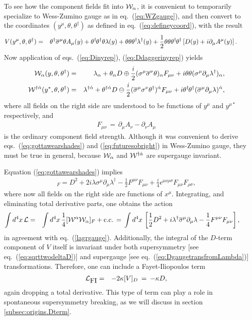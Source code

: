 \documentclass[12pt]{article}
\def\BDplus{+}
\def\BDminus{-}
\def\thetasigmamuthetadagger{\theta\sigma^\mu\theta^\dagger}
\def\BDplus{-}
\def\BDminus{+}
\def\thetasigmamuthetadagger{\theta^\dagger\sigmabar^\mu\theta}
\def\BDplus{\oplus}
\def\BDminus{\ominus}
\def\thetasigmamuthetadagger{\theta\sigma^\mu\theta^\dagger}
\def\BDplus{\ominus}
\def\BDminus{\oplus}
\def\thetasigmamuthetadagger{\theta^\dagger\sigmabar^\mu\theta}
\newcommand{\thdthd}{\theta^\dagger\hspace{-1pt}\theta^\dagger}
\def\beq{\begin{eqnarray}}
\def\eeq{\end{eqnarray}}
\def\sigmabar{\overline\sigma}
\begin{document}
To see how the component fields fit into ${\cal W}_\alpha$, it is convenient
to temporarily specialize to Wess-Zumino gauge as in eq.~(\ref{eq:WZgauge}), and
then convert to the coordinates $(y^\mu, \theta, \theta^\dagger)$ 
as defined in eq.~(\ref{eq:defineycoord}), with the result 
\beq
V(y^\mu, \theta,\theta^\dagger) &=&
\thetasigmamuthetadagger  A_\mu(y) 
+ \thdthd \theta \lambda(y) 
+ \theta \theta  \theta^\dagger\hspace{-1pt} \lambda^\dagger(y)  
+ \frac{1}{2} \theta\theta\thdthd 
\left [D(y)
+ i \partial_\mu A^\mu(y) \right ].\phantom{xxx}
\eeq
Now application of eqs.~(\ref{eq:Dinyrep}), (\ref{eq:Ddaggerinyrep}) 
yields
\beq
{\cal W}_\alpha(y,\theta,\theta^\dagger)
&=& 
\lambda_\alpha + \theta_\alpha D 
\BDminus \frac{i}{2} (\sigma^\mu\sigmabar^\nu\theta)_\alpha F_{\mu\nu}
+ i \theta\theta (\sigma^\mu\partial_\mu \lambda^\dagger)_\alpha ,
\label{eq:gottawearshades}
\\
{\cal W}^{\dagger\dot\alpha}(y^*,\theta,\theta^\dagger)
&=& 
\lambda^{\dagger\dot \alpha} + \theta^{\dagger\dot\alpha} D 
\BDplus \frac{i}{2} (\sigmabar^\mu\sigma^\nu \theta^\dagger)^{\dot\alpha} 
F_{\mu\nu}
+ i \thdthd (\sigmabar^\mu\partial_\mu \lambda  )^{\dot\alpha},
\label{eq:futuresobright}
\eeq
where 
all fields on the right side are understood to be functions of 
$y^\mu$ and $y^{\mu *}$ respectively, and
\beq
F_{\mu\nu} \,=\, \partial_\mu A_\nu - \partial_\nu A_\mu
\eeq
is the ordinary component field strength.
Although it was convenient to derive eqs.~(\ref{eq:gottawearshades}) and 
(\ref{eq:futuresobright}) in Wess-Zumino gauge, they must 
be true in general, because ${\cal W}_\alpha$ and ${\cal W}^{\dagger\dot\alpha}$ 
are supergauge invariant.

Equation (\ref{eq:gottawearshades}) implies
\beq
[{\cal W}^\alpha {\cal W}_\alpha]_F = D^2 +
2 i \lambda \sigma^\mu \partial_\mu \lambda^\dagger
-\frac{1}{2} F^{\mu\nu} F_{\mu\nu} 
+ \frac{i}{4} \epsilon^{\mu\nu\rho\sigma} F_{\mu\nu} F_{\rho\sigma} 
,
\label{eq:Bushwickblues}
\eeq
where now all fields on the right side are functions of $x^\mu$.
Integrating, and eliminating total derivative parts, one obtains
the action
\beq
\int d^4 x\, {\cal L} 
&=& 
\int d^4 x\, \frac{1}{4} [{\cal W}^\alpha {\cal W}_\alpha]_F + {\rm c.c.}
\,=\,
\int d^4 x\, 
\left [ 
\frac{1}{2} D^2  + 
i \lambda^\dagger \sigmabar^\mu \partial_\mu \lambda 
- \frac{1}{4} F^{\mu\nu} F_{\mu\nu} 
\right ],
\phantom{xx}
\eeq
in agreement with eq.~(\ref{lagrgauge}). 
Additionally,
the integral of the $D$-term component of $V$ itself is invariant  under 
both supersymmetry [see eq.~(\ref{eq:sqrttwodeltaD})] and supergauge [see 
eq.~(\ref{eq:DgaugetransfromLambda})]
transformations. Therefore, one can include a Fayet-Iliopoulos term
\beq
{\cal L}_{\mbox{FI}} &=& -2 \kappa [V]_D \>=\>-\kappa D,
\eeq
again dropping a total derivative. This type of term can play a role in spontaneous
supersymmetry breaking, as we will discuss in section \ref{subsec:origins.Dterm}.
\end{document}
